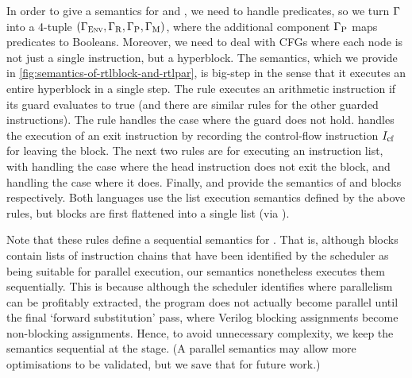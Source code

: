 In order to give a semantics for \rtlblock{} and \rtlpar{}, we need to handle predicates, so we turn $\Gamma$ into a 4-tuple
$(\Gamma_{\mathrm{\textsc{Env}}}, \Gamma_{\mathrm{R}}, \Gamma_{\mathrm{P}},
\Gamma_{\mathrm{M}})$, where the additional component $\Gamma_{\mathrm{P}}$ maps predicates to
Booleans.
Moreover, we need to deal with CFGs where each node is not just a single instruction, but a hyperblock. The semantics, which we provide in \cref{fig:semantics-of-rtlblock-and-rtlpar}, is big-step in the sense that it executes an entire hyperblock in a single step.
The  rule executes an arithmetic instruction if its guard evaluates to true (and there are similar rules for the other guarded instructions). The  rule handles the case where the guard does not hold.  handles the execution of an exit instruction by recording the control-flow instruction $I_{\mathrm{cf}}$ for leaving the block. The next two rules are for executing an instruction list, with  handling the case where the head instruction does not exit the block, and  handling the case where it does. Finally,  and  provide the semantics of \rtlblock{} and \rtlpar{} blocks respectively. Both languages use the list execution semantics defined by the above rules, but \rtlpar{} blocks are first flattened into a single list (via ).

Note that these rules define a sequential semantics for \rtlpar{}. That is, although \rtlpar{} blocks contain lists of instruction chains that have been identified by the scheduler as being suitable for parallel execution, our semantics nonetheless executes them sequentially. This is because although the scheduler identifies where parallelism can be profitably extracted, the program does not actually become parallel until the final `forward substitution' pass, where Verilog blocking assignments become non-blocking assignments. Hence, to avoid unnecessary complexity, we keep the semantics sequential at the \rtlpar{} stage. (A parallel \rtlpar{} semantics may allow more optimisations to be validated, but we save that for future work.)

\newcommand\cons{\mathbin{::}}


